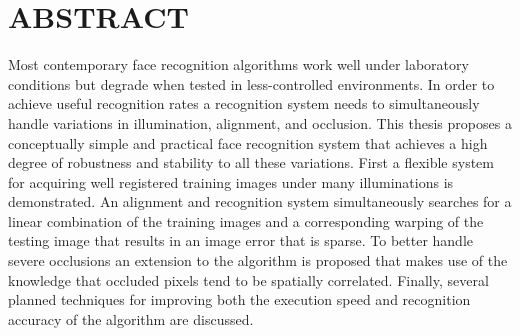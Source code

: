 \setcounter{page}{3}

\chapter*{ABSTRACT}
\doublespace



Most contemporary face recognition algorithms work well under laboratory
conditions but degrade when tested in less-controlled environments. In order to
achieve useful recognition rates a recognition system needs to simultaneously
handle variations in illumination, alignment, and occlusion. This thesis
proposes a conceptually simple and practical face recognition system that
achieves a high degree of robustness and stability to all these variations.
First a flexible system for acquiring well registered training images under
many illuminations is demonstrated.  An alignment and recognition system
simultaneously searches for a linear combination of the training images and a
corresponding warping of the testing image that results in an image error that
is sparse.  To better handle severe occlusions an extension to the algorithm is
proposed that makes use of the knowledge that occluded pixels tend to be
spatially correlated.  Finally, several planned techniques for improving both
the execution speed and recognition accuracy of the algorithm are discussed.

\newpage





\singlespace
%
\tableofcontents
\clearpage
%
\listoftables
\clearpage
%
\listoffigures

